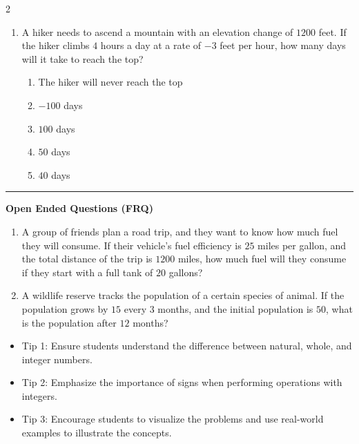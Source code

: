 \documentclass[10pt]{article}
\begin{document}
\begin{multicols}{2}
\begin{enumerate}[label=\textbf{Q\arabic*.}, leftmargin=*, itemsep=6pt, parsep=0pt]
  \item \small A hiker needs to ascend a mountain with an elevation change of $1200$ feet. If the hiker climbs $4$ hours a day at a rate of $-3$ feet per hour, how many days will it take to reach the top?
  \begin{enumerate}[label=(\Alph*), leftmargin=0.6cm, nosep, itemsep=2pt]
    \item The hiker will never reach the top
    \item $-100$ days
    \item $100$ days
    \item $50$ days
    \item $40$ days
  \end{enumerate}

\end{enumerate}
\end{multicols}

\vspace{-0.2cm}
\hrule
\vspace{0.2cm}
\textbf{\small Open Ended Questions (FRQ)}
\begin{enumerate}[label=\textbf{Q\arabic*.}, start=9, itemsep=5pt, topsep=0pt]

  \item \small A group of friends plan a road trip, and they want to know how much fuel they will consume. If their vehicle's fuel efficiency is $25$ miles per gallon, and the total distance of the trip is $1200$ miles, how much fuel will they consume if they start with a full tank of $20$ gallons? \vspace{2cm}

  \item \small A wildlife reserve tracks the population of a certain species of animal. If the population grows by $15$ every $3$ months, and the initial population is $50$, what is the population after $12$ months? \vspace{2cm}

\end{enumerate}

\vfill

\begin{tcolorbox}[colback=blue!5, colframe=mainblue!50, title=\small \textbf{Chef's Tips}, fonttitle=\bfseries, bottom=1mm]
\begin{itemize}[noitemsep, topsep=2pt, leftmargin=0.5cm]
  \item \scriptsize Tip 1: Ensure students understand the difference between natural, whole, and integer numbers.\item \scriptsize Tip 2: Emphasize the importance of signs when performing operations with integers.\item \scriptsize Tip 3: Encourage students to visualize the problems and use real-world examples to illustrate the concepts.
\end{itemize}
\end{tcolorbox}
\end{document}
